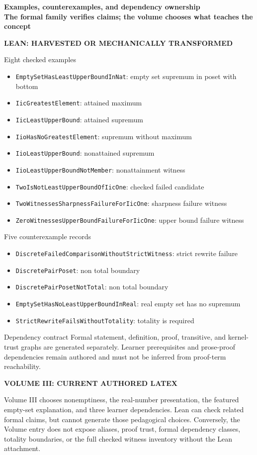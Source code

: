 \documentclass[10pt]{article}
\newcommand{\PageTitle}[2]{\begin{center}\sffamily\Large\bfseries #1\\[-1pt]\small\mdseries #2\end{center}\vspace{-4pt}}
\newcommand{\Columns}[2]{\begin{minipage}[t]{.488\textwidth}#1\end{minipage}\hfill\vrule\hfill\begin{minipage}[t]{.488\textwidth}#2\end{minipage}}
\newcommand{\LeanHead}{\color{leanblue}\sffamily\bfseries LEAN: HARVESTED OR MECHANICALLY TRANSFORMED\par\color{ink}}
\newcommand{\VolHead}{\color{volorange}\sffamily\bfseries VOLUME III: CURRENT AUTHORED LATEX\par\color{ink}}
\begin{document}
\PageTitle{Examples, counterexamples, and dependency ownership}{The formal family verifies claims; the volume chooses what teaches the concept}
\Columns{
\LeanHead
\begin{leanbox}{Eight checked examples}
\scriptsize\begin{itemize}
\item \texttt{EmptySetHasLeastUpperBoundInNat}: empty set supremum in poset with bottom
\item \texttt{IicGreatestElement}: attained maximum
\item \texttt{IicLeastUpperBound}: attained supremum
\item \texttt{IioHasNoGreatestElement}: supremum without maximum
\item \texttt{IioLeastUpperBound}: nonattained supremum
\item \texttt{IioLeastUpperBoundNotMember}: nonattainment witness
\item \texttt{TwoIsNotLeastUpperBoundOfIicOne}: checked failed candidate
\item \texttt{TwoWitnessesSharpnessFailureForIicOne}: sharpness failure witness
\item \texttt{ZeroWitnessesUpperBoundFailureForIicOne}: upper bound failure witness
\end{itemize}
\end{leanbox}
\begin{leanbox}{Five counterexample records}
\scriptsize\begin{itemize}
\item \texttt{DiscreteFailedComparisonWithoutStrictWitness}: strict rewrite failure
\item \texttt{DiscretePairPoset}: non total boundary
\item \texttt{DiscretePairPosetNotTotal}: non total boundary
\item \texttt{EmptySetHasNoLeastUpperBoundInReal}: real empty set has no supremum
\item \texttt{StrictRewriteFailsWithoutTotality}: totality is required
\end{itemize}
\end{leanbox}
\begin{leanbox}{Dependency contract}
Formal statement, definition, proof, transitive, and kernel-trust graphs are
generated separately. Learner prerequisites and prose-proof dependencies
remain authored and must not be inferred from proof-term reachability.
\end{leanbox}
}{
\VolHead

\begin{tcolorbox}[colback=softorange,colframe=volorange,title=\textbf{Comparison verdict},boxrule=.6pt]
\small
Volume III chooses nonemptiness, the real-number presentation, the featured
empty-set explanation, and three learner dependencies. Lean can check related
formal claims, but cannot generate those pedagogical choices. Conversely, the
Volume entry does not expose aliases, proof trust, formal dependency classes,
totality boundaries, or the full checked witness inventory without the Lean
attachment.
\end{tcolorbox}
}
\newpage
\end{document}
